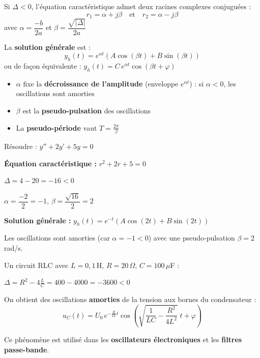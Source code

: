 \documentclass[a4paper,11pt]{article}
\begin{document}
\begin{theoreme}
Si $\Delta < 0$, l'équation caractéristique admet deux racines complexes conjuguées :
\[
r_1 = \alpha + j\beta \quad \text{et} \quad r_2 = \alpha - j\beta
\]
avec $\alpha = \dfrac{-b}{2a}$ et $\beta = \dfrac{\sqrt{|\Delta|}}{2a}$

La \textbf{solution générale} est :
\[
\boxed{y_h(t) = e^{\alpha t}\left(A\cos(\beta t) + B\sin(\beta t)\right)}
\]
ou de façon équivalente : $y_h(t) = C\,e^{\alpha t}\cos(\beta t + \varphi)$
\end{theoreme}

\begin{remarque}
\begin{itemize}
  \item $\alpha$ fixe la \textbf{décroissance de l'amplitude} (enveloppe $e^{\alpha t}$) : si $\alpha < 0$, les oscillations sont amorties
  \item $\beta$ est la \textbf{pseudo-pulsation} des oscillations
  \item La \textbf{pseudo-période} vaut $T = \frac{2\pi}{\beta}$
\end{itemize}
\end{remarque}

\begin{exemple}
Résoudre : $y'' + 2y' + 5y = 0$

\textbf{Équation caractéristique :} $r^2 + 2r + 5 = 0$

$\Delta = 4 - 20 = -16 < 0$

$\alpha = \dfrac{-2}{2} = -1$, \quad $\beta = \dfrac{\sqrt{16}}{2} = 2$

\textbf{Solution générale :} $y_h(t) = e^{-t}\left(A\cos(2t) + B\sin(2t)\right)$

Les oscillations sont amorties (car $\alpha = -1 < 0$) avec une pseudo-pulsation $\beta = 2\,$rad/s.
\end{exemple}

\begin{appliindus}
Un circuit RLC avec $L = 0{,}1\,$H, $R = 20\,\Omega$, $C = 100\,\mu$F :

$\Delta = R^2 - 4\frac{L}{C} = 400 - 4000 = -3600 < 0$

On obtient des oscillations \textbf{amorties} de la tension aux bornes du condensateur :
\[
u_C(t) = U_0\,e^{-\frac{R}{2L}t}\cos\!\left(\sqrt{\frac{1}{LC} - \frac{R^2}{4L^2}}\;t + \varphi\right)
\]

Ce phénomène est utilisé dans les \textbf{oscillateurs électroniques} et les \textbf{filtres passe-bande}.
\end{appliindus}
\end{document}
